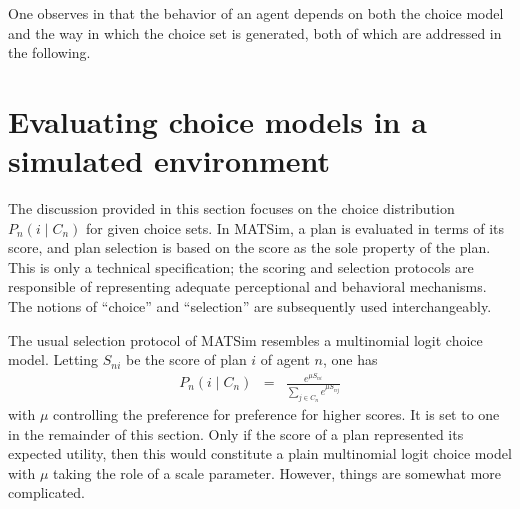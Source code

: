 One observes in  that the
behavior of an agent depends on both the choice model and the way
in which the choice set is generated, both of which are addressed
in the following.


\section{\label{sec:Evaluating-choice-models}Evaluating choice models in
a simulated environment}

The discussion provided in this section focuses on the choice distribution
$P_{n}(i\mid C_{n})$ for given choice sets. In MATSim, a plan is
evaluated in terms of its score, and plan selection is based on the
score as the sole property of the plan. This is only a technical specification;
the scoring and selection protocols are responsible of representing
adequate perceptional and behavioral mechanisms. The notions of {}``choice''
and {}``selection'' are subsequently used interchangeably. 

The usual selection protocol of MATSim resembles a multinomial logit
choice model. Letting $S_{ni}$ be the score of plan $i$ of agent
$n$, one has
\begin{eqnarray}
P_{n}(i\mid C_{n}) & = & \frac{e^{\mu S_{ni}}}{\sum_{j\in C_{n}}e^{\mu S_{nj}}}\label{eq:ExpBetaPlanSelector}
\end{eqnarray}
with $\mu$ controlling the preference for preference for higher scores.
It is set to one in the remainder of this section. Only if the score
of a plan represented its expected utility, then this would constitute
a plain multinomial logit choice model with $\mu$ taking the role
of a scale parameter. However, things are somewhat more complicated.

